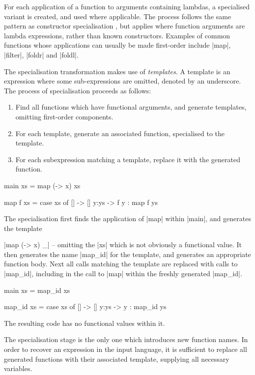\documentclass[preprint]{sigplanconf}
\begin{document}
For each application of a function to arguments containing lambdas, a specialised variant is created, and used where applicable. The process follows the same pattern as constructor specialisation \cite{spj:specconstr}, but applies where function arguments are lambda expressions, rather than known constructors. Examples of common functions whose applications can usually be made first-order include |map|, |filter|, |foldr| and |foldl|.

The specialisation transformation makes use of \textit{templates}. A template is an expression where some sub-expressions are omitted, denoted by an underscore. The process of specialisation proceeds as follows:

\begin{enumerate}
\item Find all functions which have functional arguments, and generate templates, omitting first-order components.
\item For each template, generate an associated function, specialised to the template.
\item For each subexpression matching a template, replace it with the generated function.
\end{enumerate}

\begin{example}
\begin{code}
main xs = map (\x -> x) xs

map f xs = case  xs of
                 []    -> []
                 y:ys  -> f y : map f ys
\end{code}

The specialisation first finds the application of |map| within |main|, and generates the template \ignore|map (\x -> x) _| -- omitting the |xs| which is not obviously a functional value. It then generates the name |map_id| for the template, and generates an appropriate function body. Next all calls matching the template are replaced with calls to |map_id|, including in the call to |map| within the freshly generated |map_id|.

\begin{code}
main xs = map_id xs

map_id xs = case  xs of
                  []    -> []
                  y:ys  -> y : map_id ys
\end{code}

The resulting code has no functional values within it.
\end{example}

The specialisation stage is the only one which introduces new function names. In order to recover an expression in the input language, it is sufficient to replace all generated functions with their associated template, supplying all necessary variables.
\end{document}

